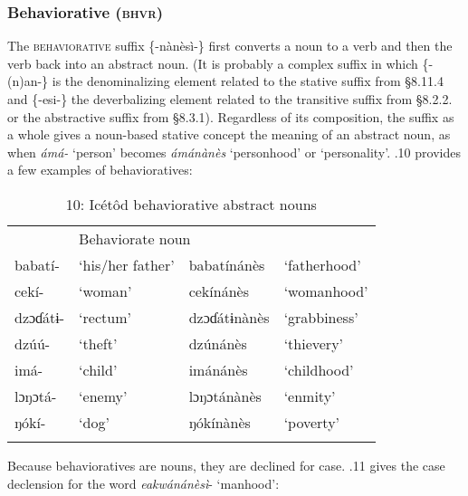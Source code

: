 \subsubsection{Behaviorative (\textsc{bhvr})}

The \textsc{behaviorative} suffix \{-nànèsì-\} first converts a noun to a verb and then the verb back into an abstract noun. (It is probably a complex suffix in which \{-(n)an-\} is the denominalizing element related to the stative suffix from §8.11.4 and \{-esi-\} the deverbalizing element related to the transitive suffix from §8.2.2. or the abstractive suffix from §8.3.1). Regardless of its composition, the suffix as a whole gives a noun-based stative concept the meaning of an abstract noun, as when \textit{ámá-} ‘person’ becomes \textit{ámánànès} ‘personhood’ or ‘personality’. .10 provides a few examples of behavioratives:


\begin{table}
\caption{10: Icétôd behaviorative abstract nouns}
\label{tab:8}


\begin{tabularx}{\textwidth}{XXXX}
\lsptoprule

\multicolumn{2}{X}{Noun root} & \multicolumn{2}{X}{Behaviorate noun}\\
babatí- & ‘his/her father’ & babatínánès & ‘fatherhood’\\
cekí- & ‘woman’ & cekínánès & ‘womanhood’\\
dzɔɗátɨ- & ‘rectum’ & dzɔɗátɨnànès & ‘grabbiness’\\
dzúú- & ‘theft’ & dzúnánès & ‘thievery’\\
imá- & ‘child’ & imánánès & ‘childhood’\\
lɔŋɔtá- & ‘enemy’ & lɔŋɔtánànès & ‘enmity’\\
ŋókí- & ‘dog’ & ŋókínànès & ‘poverty’\\
\lspbottomrule
\end{tabularx}
\end{table}
Because behavioratives are nouns, they are declined for case. .11 gives the case declension for the word \textit{eakwánánèsì}{}- ‘manhood’:


